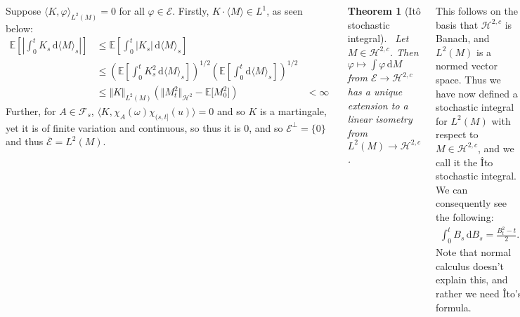 \documentclass{tikzposter} %
\newcommand\leftopen[2]{\ensuremath{(#1,#2]}}
\newtheorem{theorem}{Theorem}
\begin{document}
\begin{columns}
{      Suppose $\langle K, \varphi \rangle_{L^{2}(M)} = 0$ for all $\varphi \in \mathcal{E}$. Firstly, $K \cdot \langle M \rangle \in L^{1}$, as seen below:
      \begin{align*}
        \mathbb{E}\left[\left|\int_{0}^{t} K_{s} \, \mathrm{d}\langle M \rangle_{s}\right|\right] &\le \mathbb{E}\left[\int_{0}^{t} |K_{s}| \, \mathrm{d}\langle M \rangle_{s}\right] \\
                                                                                                  &\le \left(\mathbb{E}\left[\int_{0}^{t} K_{s}^{2} \, \mathrm{d}\langle M \rangle_{s}\right]\right)^{1/2} \left(\mathbb{E}\left[\int_{0}^{t}\mathrm{d}\langle M \rangle_{s}\right]\right)^{1/2} \\
        &\le \Vert K \Vert_{L^{2}(M)} (\Vert M_{t}^{2} \Vert_{\mathcal{H}^{2}} - \mathbb{E}\big[M_{0}^{2}\big])
        &< \infty
      \end{align*}
      Further, for $A \in \mathcal{F}_{s}$, $\langle K, \chi_{A}(\omega) \chi_{\leftopen{s}{t}}(u) \rangle = 0$ and so $K$ is a martingale, yet it is of finite variation and continuous, so thus it is $0$, and so $\mathcal{E}^{\perp} = \{0\}$ and thus $\overline{\mathcal{E}} = L^{2}(M)$. \\

      \begin{theorem}[It\^o stochastic integral]
      \ Let $M \in \mathcal{H}^{2,c}$. Then $\varphi \mapsto \int \varphi \, \mathrm{d}M$ from $\mathcal{E} \to \mathcal{H}^{2,c}$ has a unique extension to a linear isometry from $L^{2}(M) \to \mathcal{H}^{2,c}$.
      \end{theorem}
      \hphantom{}

      This follows on the basis that $\mathcal{H}^{2,c}$ is Banach, and $L^{2}(M)$ is a normed vector space. Thus we have now defined a stochastic integral for $L^{2}(M)$ with respect to $M \in \mathcal{H}^{2,c}$, and we call it the \^Ito stochastic integral. \\

      We can consequently see the following:
      \begin{align*}
        \int_{0}^{t} B_{s} \, \mathrm{d}B_{s} = \frac{B_{t}^{2}-t}{2}.
      \end{align*}
      Note that normal calculus doesn't explain this, and rather we need \^Ito's formula. \\

      \begin{theorem}
      \ Let $M \in \mathcal{H}^{2,c}$, $K \in L^{2}(M)$. There is a unique element in $J \in \mathcal{H}^{2,c}_{0}$ such that for all $N \in \mathcal{H}^{2,c}$,
      \begin{align*}
        \left\langle J, N\right\rangle = \int_{0}^{\infty} K_{s} \, \mathrm{d}\langle M, N \rangle_{s}
      \end{align*}
      and $\Vert J \Vert_{\mathcal{H}^{2,c}} = \Vert K \Vert_{L^{2}(M)}$. We denote $\int_{0}^{t} K_{s} \, \mathrm{d}M_{s} := J_{t}$.
      \end{theorem}
      \hphantom{}

}
\end{columns}
\end{document}
